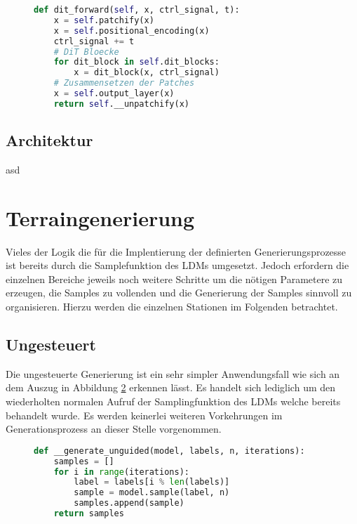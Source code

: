 \begin{figure}[htbp]
\begin{lstlisting}[language=python]
def dit_forward(self, x, ctrl_signal, t):
    x = self.patchify(x)
    x = self.positional_encoding(x)
    ctrl_signal += t
    # DiT Bloecke
    for dit_block in self.dit_blocks:
        x = dit_block(x, ctrl_signal)
    # Zusammensetzen der Patches
    x = self.output_layer(x)
    return self.__unpatchify(x)
\end{lstlisting}
    \captionsetup{type=figure}
    \label{fig:DiT_forward}
\end{figure}

\subsection{Architektur}

asd



\section {Terraingenerierung}

Vieles der Logik die für die Implentierung der definierten Generierungsprozesse ist bereits durch die Samplefunktion des LDMs umgesetzt. Jedoch erfordern die einzelnen Bereiche jeweils noch weitere Schritte um die nötigen Parametere zu erzeugen, die Samples zu vollenden und die Generierung der Samples sinnvoll zu organisieren. Hierzu werden die einzelnen Stationen im Folgenden betrachtet.

\subsection {Ungesteuert}

Die ungesteuerte Generierung ist ein sehr simpler Anwendungsfall wie sich an dem Auszug in Abbildung \ref{fig:gen_unguided} erkennen lässt. Es handelt sich lediglich um den wiederholten normalen Aufruf der Samplingfunktion des LDMs welche bereits behandelt wurde. Es werden keinerlei weiteren Vorkehrungen im Generationsprozess an dieser Stelle vorgenommen.   
\begin{figure}[htbp]
\begin{lstlisting}[language=python]
def __generate_unguided(model, labels, n, iterations):
    samples = []
    for i in range(iterations):
        label = labels[i % len(labels)]
        sample = model.sample(label, n)
        samples.append(sample)
    return samples
\end{lstlisting}
    \captionsetup{type=figure}
    \label{fig:gen_unguided}
\end{figure}

